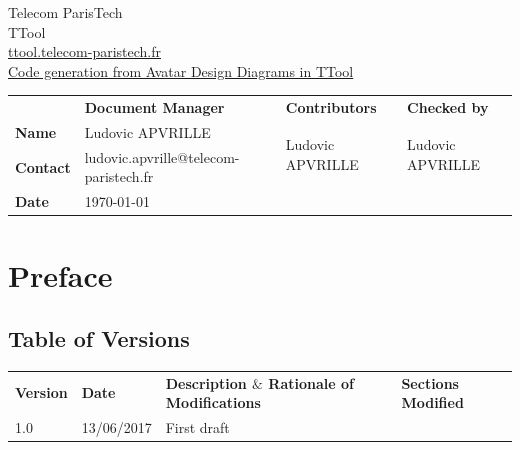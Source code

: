 \documentclass[12pt]{article}
\begin{document}
\sloppy 

\begin{center}
\Large Telecom ParisTech \\
\Large TTool \\
\Large \url{ttool.telecom-paristech.fr}
\vspace{20 pt}\\
\underline{\Large Code generation from Avatar Design Diagrams in TTool}
\vspace{30 pt}
\end{center}

\begin{table}[H]
\large
\centering
\begin{adjustbox}{width=\textwidth}
\begin{tabular}{ |p{1.6cm}|p{6.0cm}|p{4.2cm}|p{4.2cm}| }
\hhline{----}
 & \textbf{Document Manager} & \textbf{Contributors}  & \textbf{Checked by}  \\ 
\hhline{----}
\textbf{Name}   & Ludovic APVRILLE & \multirow{2}{*}{Ludovic APVRILLE} &
\multirow{2}{*}{Ludovic APVRILLE} \\
\hhline{--~~}
\textbf{Contact} & ludovic.apvrille@telecom-paristech.fr &  &  \\ 
\hhline{--~~}
\textbf{Date} & \today &  &  \\ 
\hline
\end{tabular}
\end{adjustbox}
\end{table}

\newpage
\tableofcontents


\newpage
\section{Preface}

\subsection{Table of Versions}

\begin{table}[H]
\large
\centering
\begin{adjustbox}{width=\textwidth}
\begin{tabular}{ |p{1.5cm}|p{2.5cm}|p{9.0cm}|p{3.0cm}| }
\hhline{----}
\textbf{Version} & \textbf{Date} & \textbf{Description  $  \&  $  Rationale of
Modifications} & \textbf{Sections Modified} \\
\hhline{----}
1.0 & 13/06/2017 & First draft &  \\ 
\hline
\end{tabular}
\end{adjustbox}
\end{table}
\end{document}
